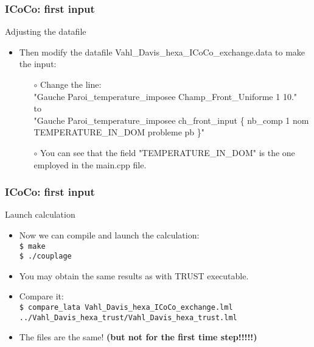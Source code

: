 \documentclass[10pt, hyperref={unicode=true,pdfusetitle, bookmarks=true,bookmarksnumbered=false,bookmarksopen=false, breaklinks=false,pdfborder={0 0 1},backref=true,colorlinks=true,linkcolor=darkblue,pageanchor, urlcolor=darkblue}]{beamer}
\begin{document}
\begin{frame}
\frametitle{ICoCo: first input}
\begin{block}{Adjusting the datafile}

\begin{itemize}
\item Then modify the datafile Vahl\_Davis\_hexa\_ICoCo\_exchange.data to make the input:
    \begin{itemize}
    \item [$\circ$] Change the line:\\
    "Gauche Paroi\_temperature\_imposee Champ\_Front\_Uniforme 1 10."\\
     to \\
    "Gauche Paroi\_temperature\_imposee ch\_front\_input \{ nb\_comp 1 nom TEMPERATURE\_IN\_DOM probleme pb \}"
    \item [$\circ$] You can see that the field "TEMPERATURE\_IN\_DOM" is the one employed in the main.cpp file.
    \end{itemize}
\end{itemize}

\end{block}
\end{frame}
\begin{frame}
\frametitle{ICoCo: first input}
\begin{block}{Launch calculation}

\begin{itemize}
\item Now we can compile and launch the calculation:\\
\texttt{\$ make}\\
\texttt{\$ ./couplage}
\item You may obtain the same results as with TRUST executable.
\item Compare it:\\
\texttt{\$ compare\_lata Vahl\_Davis\_hexa\_ICoCo\_exchange.lml ../Vahl\_Davis\_hexa\_trust/Vahl\_Davis\_hexa\_trust.lml}
\item The files are the same! \textbf{(but not for the first time step!!!!!)}
\end{itemize}

\end{block}
\end{frame}
\end{document}
